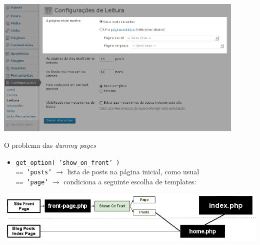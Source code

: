 \documentclass{beamer}
\begin{document}
\begin{frame}
\begin{center}
  \includegraphics[width=0.9\textwidth]{./img/option-show-on-front.png}
\end{center}
\end{frame}

\begin{frame}{O problema das \emph{dummy pages}}
\begin{itemize}
  \pause \item{\texttt{get\_option( 'show\_on\_front' )}} \\
    \pause \texttt{== 'posts'} $\rightarrow$ lista de posts na página inicial,
      como usual \\
    \pause \texttt{== 'page'} $\rightarrow$ condiciona a seguinte escolha de
      templates:
\end{itemize}
\end{frame}

\begin{frame}
\begin{center}
  \includegraphics[width=\textwidth]{./img/template-hierarchy-front.png}
\end{center}
\end{frame}
\end{document}
